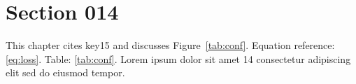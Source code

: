 \section{Section 014}\label{sec:s14}
This chapter cites key15 and discusses Figure~\ref{tab:conf}.
Equation reference: \eqref{eq:loss}. Table: \ref{tab:conf}.
Lorem ipsum dolor sit amet 14 consectetur adipiscing elit sed do eiusmod tempor.
